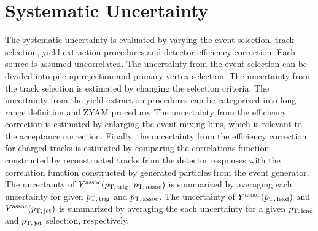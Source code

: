 \section{Systematic Uncertainty}
\label{sec:uncertainties}
The systematic uncertainty is evaluated by varying the event selection, track selection, yield extraction procedures and detector efficiency correction. Each source is assumed uncorrelated. The uncertainty from the event selection can be divided into pile-up rejection and primary vertex selection. The uncertainty from the track selection is estimated by changing the selection criteria. The uncertainty from the yield extraction procedures can be categorized into long-range definition and ZYAM procedure. The uncertainty from the efficiency correction is estimated by enlarging the event mixing bins, which is relevant to the acceptance correction.
Finally, the uncertainty from the efficiency correction for charged tracks is estimated by comparing the correlations function constructed by reconstructed tracks from the detector responses with the correlation function constructed by generated particles from the event generator.
The uncertainty of $Y^{\rm{assoc}}(p_\mathrm{T,\,trig},\,p_\mathrm{T,\,assoc})$ is summarized by averaging each uncertainty for given $p_\mathrm{T,\,trig}$ and $p_\mathrm{T,\,assoc}$. The uncertainty of $Y^{\rm{assoc}}(p_\mathrm{T,\,lead})$ and $Y^{\rm{assoc}}(p_\mathrm{T,\,jet})$ is summarized by averaging the each uncertainty for a given $p_\mathrm{T,\,lead}$ and $p_\mathrm{T,\,jet}$ selection, respectively.
